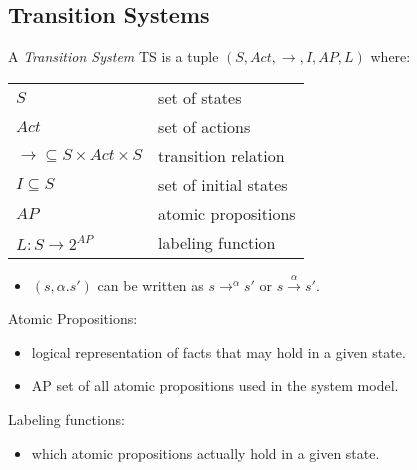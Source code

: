 \documentclass[a4paper, 10pt]{article}
\begin{document}
\subsection{Transition Systems}

\begin{mdframed}[roundcorner=5pt,
subtitlebelowline=false,subtitleaboveline=false,
subtitlebackgroundcolor=blue!30,
frametitlerule=true,
frametitlebackgroundcolor=blue!30,
frametitle={Transition System}
]
A \emph{Transition System} TS is a tuple $(S,Act,\rightarrow, I, AP, L)$ where:\\
\begin{tabular}{ll}
$S$ & set of states\\
$Act$ & set of actions\\
$\rightarrow\subseteq S\times Act\times S$ & transition relation\\
$I\subseteq S$ & set of initial states\\
$AP$ & atomic propositions\\
$L:S\rightarrow 2^{AP}$ & labeling function\\
\end{tabular}
\begin{itemize}
    \item $(s,\alpha.s')$ can be written as $s\rightarrow^\alpha s'$ or $s\overset{\alpha}{\longrightarrow}s'$.
\end{itemize}
\end{mdframed}
\begin{center}
\scalebox{1.5}{}
\end{center}

Atomic Propositions:
\begin{itemize}
    \item logical representation of facts that may hold in a given state.
    \item AP set of all atomic propositions used in the system model.
\end{itemize}

Labeling functions:
\begin{itemize}
    \item which atomic propositions actually hold in a given state.
\end{itemize}
\end{document}
